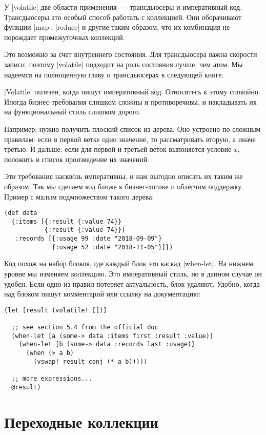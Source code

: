 У \spverb|volatile| две области применения~--- трансдьюсеры и императивный
код. Трансдьюсеры это особый способ работать с коллекцией. Они оборачивают
функции \spverb|map|, \spverb|reduce| и другие таким образом, что их комбинация
не порождает промежуточных коллекций.

Это возможно за счет внутреннего состояния. Для трансдьюсера важна скорости
записи, поэтому \spverb|volatile| подходит на роль состояния лучше, чем атом. Мы
надеемся на полноценную главу о трансдьюсерах в следующей книге.

\spverb|Volatile| полезен, когда пишут императивный код. Относитесь к этому
спокойно. Иногда бизнес-требования слишком сложны и противоречивы, и накладывать
их на функциональный стиль слишком дорого.

Например, нужно получить плоский список из дерева. Оно устроено по сложным
правилам: если в первой ветке одно значение, то рассматривать вторую, а иначе
третью. И дальше: если для первой и третьей веток выпоняется условие $x$,
положить в список произведение их значений.

Эти требования насквозь императивны, и нам выгодно описать их таким же
образом. Так мы сделаем код ближе к бизнес-логике и облегчим поддержку. Пример с
малым подмножеством такого дерева:

\begin{verbatim}
(def data
  {:items [{:result {:value 74}}
           {:result {:value 74}}]
   :records [{:usage 99 :date "2018-09-09"}
             {:usage 52 :date "2018-11-05"}]})
\end{verbatim}

Код похож на набор блоков, где каждый блок это каскад \spverb|when-let|. На
нижнем уровне мы изменяем коллекцию. Это императивный стиль, но в данном случае
он удобен. Если одно из правил потеряет актуальность, блок удаляют. Удобно,
когда над блоком пишут комментарий или ссылку на документацию:

\begin{verbatim}
(let [result (volatile! [])]

  ;; see section 5.4 from the official doc
  (when-let [a (some-> data :items first :result :value)]
    (when-let [b (some-> data :records last :usage)]
      (when (> a b)
        (vswap! result conj (* a b)))))

  ;; more expressions...
  @result)
\end{verbatim}

\section{Переходные коллекции}

